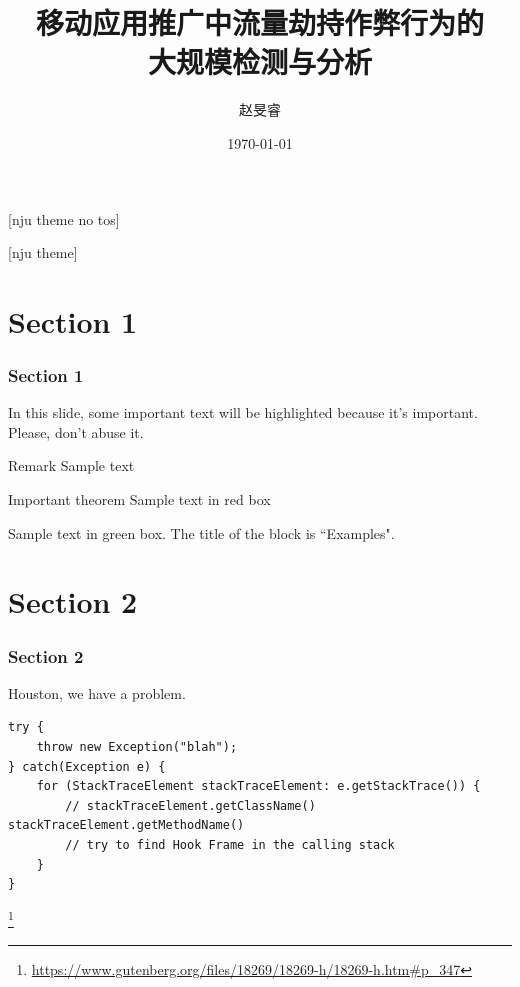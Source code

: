 \documentclass[10pt,aspectratio=169,mathserif]{beamer}
\title[]{移动应用推广中流量劫持作弊行为的\\大规模检测与分析}
\subtitle{}
\author[]{赵旻睿}
\institute[COSEC]{南京大学网络合作与安全研究中心}
\date{\today}
\newcommand\blfootnote[1]{%
\begingroup
\renewcommand\thefootnote{}\footnote{#1}%
\addtocounter{footnote}{-1}%
\endgroup
}
\newcommand{\nologo}{\setbeamertemplate{logo}{}}    %
\begin{document}
[nju theme no tos] 
\frame{\titlepage}

\nologo

[nju theme]


\section{Section 1}
\begin{frame}
  \frametitle{Section 1}

    In this slide, some important text will be
    \alert{highlighted} because it's important.
    Please, don't abuse it.

    \begin{block}{Remark}
      Sample text
    \end{block}

    \begin{alertblock}{Important theorem}
      Sample text in red box
    \end{alertblock}

    \begin{examples}
      Sample text in green box. The title of the block is ``Examples".
    \end{examples}

\end{frame}

\section{Section 2}
\begin{frame}[fragile]      %
  \frametitle{Section 2}

    Houston, we have a problem.

    \vspace*{10pt}

    \begin{verbatim}
try {
    throw new Exception("blah");
} catch(Exception e) {
    for (StackTraceElement stackTraceElement: e.getStackTrace()) {
        // stackTraceElement.getClassName() stackTraceElement.getMethodName()
        // try to find Hook Frame in the calling stack
    }
}
    \end{verbatim}

    \blfootnote{\tiny \url{https://www.gutenberg.org/files/18269/18269-h/18269-h.htm\#p_347}}

\end{frame}
\end{document}
